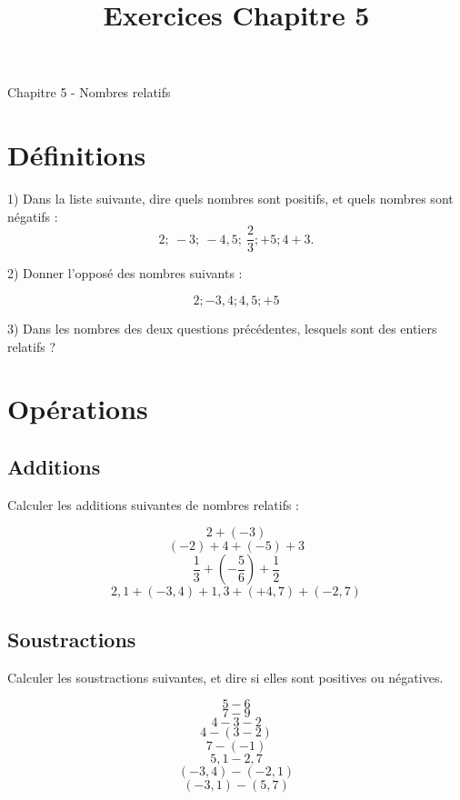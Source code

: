 \documentclass[12 pt]{article}
\title{Exercices Chapitre 5}
\date{}
\theoremstyle{plain}
\newcounter{n}
\numberwithin{n}{section}
\begin{document}
\begin{center}{\Large Chapitre 5 - Nombres relatifs}\\ 
 \end{center}


\section{Définitions}



1) Dans la liste suivante, dire quels nombres sont positifs, et quels nombres sont négatifs : 
\[ 2 ; \ -3 ; \ -4,5 ; \ \frac23 ; + 5 ; 4 + 3. \]

2) Donner l'opposé des nombres suivants : 

\[ 2 ; -3,4 ; 4,5 ; +5 \]

3) Dans les nombres des deux questions précédentes, lesquels sont des entiers relatifs ?

\section{Opérations}


\subsection{Additions}

Calculer les additions suivantes de nombres relatifs : 

\[ 2 + (-3)\]
\[ (-2) + 4 + (-5) + 3\]
\[ \frac13 + (-\frac 56) + \frac12 \]
\[ 2,1 + (-3,4) + 1,3 + (+4,7) + (- 2,7)\]

\subsection{Soustractions}

Calculer les soustractions suivantes, et dire si elles sont positives ou négatives. 

\[ 5 - 6 \]
\[ 7 - 9 \]
\[ 4 - 3 - 2\] 
\[ 4 - ( 3 - 2 ) \]
\[ 7 - (-1) \]
\[ 5,1 - 2,7\]
\[ (-3,4) - (-2,1) \]
\[ (-3,1) - (5,7)\]

%
%
\end{document}
